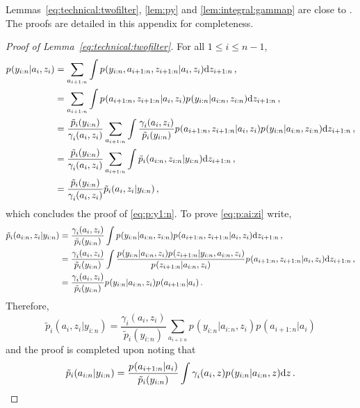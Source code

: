 \label{sec:app:proofs}
Lemmas~\ref{eq:technical:twofilter}, \ref{lem:py} and \ref{lem:integral:gammap} are close to \cite[Proposition 5, Proposition 6]{briers:doucet:maskell:2010}. The proofs are detailed in this appendix for completeness.
\begin{proof}[Proof of Lemma~\ref{eq:technical:twofilter}]
For all $1\le i \le n-1$,
\begin{align*}
p_{}(y_{i:n}|a_i,z_i) &= \sum_{a_{i+1:n}}\int p_{}(y_{i:n},a_{i+1:n},z_{i+1:n}|a_i,z_i)\mathrm{d} z_{i+1:n}\,,\\
&=  \sum_{a_{i+1:n}}\int p_{}(a_{i+1:n},z_{i+1:n}|a_i,z_i)p_{}(y_{i:n}|a_{i:n},z_{i:n})\mathrm{d} z_{i+1:n}\,,\\
&=  \frac{\tilde{p}_{i}(y_{i:n})}{\gamma^{}_{i}(a_i,z_i)}\sum_{a_{i+1:n}}\int \frac{\gamma^{}_{i}(a_i,z_i)}{\tilde{p}_{i}(y_{i:n})}p_{}(a_{i+1:n},z_{i+1:n}|a_i,z_i)p_{}(y_{i:n}|a_{i:n},z_{i:n})\mathrm{d} z_{i+1:n}\,,\\
&=  \frac{\tilde{p}_{i}(y_{i:n})}{\gamma^{}_{i}(a_i,z_i)}\sum_{a_{i+1:n}}\int \tilde{p}_{i}(a_{i:n},z_{i:n}|y_{i:n})\mathrm{d} z_{i+1:n}\,,\\
&=  \frac{\tilde{p}_{i}(y_{i:n})}{\gamma^{}_{i}(a_i,z_i)}\tilde{p}_{i}(a_{i},z_{i}|y_{i:n})\,,
\end{align*}
which concludes the proof of \eqref{eq:p:y1:n}. To prove \eqref{eq:p:ai:zi} write,
\begin{align*}
\tilde{p}_{i}(a_{i:n},z_{i}|y_{i:n}) &= \frac{\gamma^{}_{i}(a_i,z_i)}{\tilde{p}_{i}(y_{i:n})}\int p_{}(y_{i:n}|a_{i:n},z_{i:n})p_{}(a_{i+1:n},z_{i+1:n}|a_{i},z_{i})\mathrm{d} z_{i+1:n}\,,\\
&= \frac{\gamma^{}_{i}(a_i,z_i)}{\tilde{p}_{i}(y_{i:n})}\int \frac{p_{}(y_{i:n}|a_{i:n},z_{i})p_{}(z_{i+1:n}|y_{i:n},a_{i:n},z_i)}{p_{}(z_{i+1:n}|a_{i:n},z_i)}p_{}(a_{i+1:n},z_{i+1:n}|a_{i},z_{i})\mathrm{d} z_{i+1:n}\,,\\
&=\frac{\gamma^{}_{i}(a_i,z_i)}{\tilde{p}_{i}(y_{i:n})}p_{}(y_{i:n}|a_{i:n},z_{i})p_{}(a_{i+1:n}|a_i)\,.
\end{align*}
Therefore,
\[
\tilde{p}_{i}(a_{i},z_{i}|y_{i:n}) = \frac{\gamma^{}_{i}(a_i,z_i)}{\tilde{p}_{i}(y_{i:n})}\sum_{a_{i+1:n}}p_{}(y_{i:n}|a_{i:n},z_{i})p_{}(a_{i+1:n}|a_i)
\]
and the proof is completed upon noting that
\[
\tilde{p}_{i}(a_{i:n}|y_{i:n}) = \frac{p_{}(a_{i+1:n}|a_i)}{\tilde{p}_{i}(y_{i:n})} \int \gamma^{}_{i}(a_i,z)p_{}(y_{i:n}|a_{i:n},z)\mathrm{d} z\,.
\]
\end{proof}


